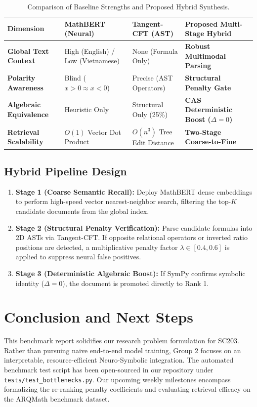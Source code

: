 \documentclass[11pt,a4paper]{article}
\begin{document}
	\begin{table}[H]
		\centering
		\small
		\caption{Comparison of Baseline Strengths and Proposed Hybrid Synthesis.}
		\label{tab:comparison}
		\begin{tabularx}{\textwidth}{lXXX}
			\toprule
			\textbf{Dimension} & \textbf{MathBERT (Neural)} & \textbf{Tangent-CFT (AST)} & \textbf{Proposed Multi-Stage Hybrid} \\
			\midrule
			\textbf{Global Text Context} & High (English) / Low (Vietnamese) & None (Formula Only) & \textbf{Robust Multimodal Parsing} \\
			\textbf{Polarity Awareness} & Blind ($x>0 \approx x<0$) & Precise (AST Operators) & \textbf{Structural Penalty Gate} \\
			\textbf{Algebraic Equivalence} & Heuristic Only & Structural Only (25\%) & \textbf{CAS Deterministic Boost ($\Delta=0$)} \\
			\textbf{Retrieval Scalability} & $O(1)$ Vector Dot Product & $O(n^3)$ Tree Edit Distance & \textbf{Two-Stage Coarse-to-Fine} \\
			\bottomrule
		\end{tabularx}
	\end{table}

	\subsection{Hybrid Pipeline Design}
	\begin{enumerate}
		\item \textbf{Stage 1 (Coarse Semantic Recall):} Deploy MathBERT dense embeddings to perform high-speed vector nearest-neighbor search, filtering the top-$K$ candidate documents from the global index.
		\item \textbf{Stage 2 (Structural Penalty Verification):} Parse candidate formulas into 2D ASTs via Tangent-CFT. If opposite relational operators or inverted ratio positions are detected, a multiplicative penalty factor $\lambda \in [0.4, 0.6]$ is applied to suppress neural false positives.
		\item \textbf{Stage 3 (Deterministic Algebraic Boost):} If SymPy confirms symbolic identity ($\Delta = 0$), the document is promoted directly to Rank 1.
	\end{enumerate}

	\section{Conclusion and Next Steps}
	This benchmark report solidifies our research problem formulation for SC203. Rather than pursuing naive end-to-end model training, Group 2 focuses on an interpretable, resource-efficient Neuro-Symbolic integration. The automated benchmark test script has been open-sourced in our repository under \texttt{tests/test\_bottlenecks.py}. Our upcoming weekly milestones encompass formalizing the re-ranking penalty coefficients and evaluating retrieval efficacy on the ARQMath benchmark dataset.
\end{document}

